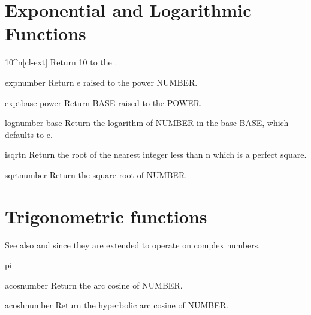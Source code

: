 \documentclass[10pt,english]{book}
\begin{document}
\section{Exponential and Logarithmic Functions}
\label{sec:expon-logar-funct}

\begin{function}[10caret]{10\^{}}{n}[cl-ext]
  Return 10 to the .
\end{function}

\begin{function}{exp}{number}
  Return e raised to the power NUMBER.
\end{function}

\begin{function}{expt}{base power}
  Return BASE raised to the POWER.
\end{function}

\begin{function}{log}{number \op base}
  Return the logarithm of NUMBER in the base BASE, which defaults to e.
\end{function}

\begin{function}{isqrt}{n}
  Return the root of the nearest integer less than n which is a perfect
   square.
\end{function}

\begin{function}{sqrt}{number}
  Return the square root of NUMBER.
\end{function}

\section{Trigonometric functions}
\label{sec:trig-funct}

See also  and  since they are extended to operate
on complex numbers.

\begin{constant}{pi}{}
  
\end{constant}

\begin{function}{acos}{number}
  Return the arc cosine of NUMBER.
\end{function}

\begin{function}{acosh}{number}
  Return the hyperbolic arc cosine of NUMBER.
\end{function}
\end{document}
